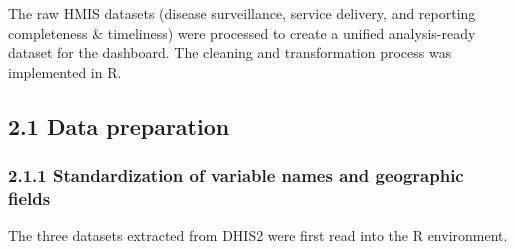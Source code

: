 \documentclass[
  letterpaper,
  DIV=11,
  numbers=noendperiod]{scrartcl}
\begin{document}
The raw HMIS datasets (disease surveillance, service delivery, and
reporting completeness \& timeliness) were processed to create a unified
analysis-ready dataset for the dashboard. The cleaning and
transformation process was implemented in R.

\subsection{2.1 Data preparation}\label{data-preparation}

\subsubsection{2.1.1 Standardization of variable names and geographic
fields}\label{standardization-of-variable-names-and-geographic-fields}

The three datasets extracted from DHIS2 were first read into the R
environment.
\end{document}
